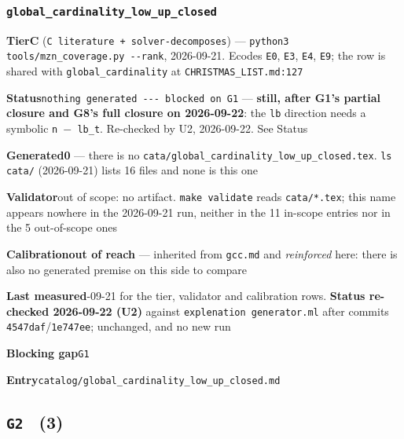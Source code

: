 \documentclass[10pt,a4paper]{article}
\newcommand{\entryfield}[2]{{\raggedright\textbf{#1}\quad #2\par}}
\begin{document}
\subsubsection*{\texttt{global\_\allowbreak{}cardinality\_\allowbreak{}low\_\allowbreak{}up\_\allowbreak{}closed}}
\label{entry:global-cardinality-low-up-closed}
\entryfield{Tier}{\textbf{C} (\texttt{C literature + solver-\allowbreak{}decomposes}) --- \texttt{python3 tools/\allowbreak{}mzn\_\allowbreak{}coverage.\allowbreak{}py -\allowbreak{}-\allowbreak{}rank}, 2026-09-21. Ecodes \texttt{E0}, \texttt{E3}, \texttt{E4}, \texttt{E9}; the row is shared with \texttt{global\_cardinality} at \texttt{CHRISTMAS\_LIST.md:127}}
\entryfield{Status}{\texttt{nothing generated -\allowbreak{}-\allowbreak{}-\allowbreak{} blocked on G1} --- \textbf{still, after G1's partial closure and G8's full closure on 2026-09-22}: the \texttt{lb} direction needs a symbolic \texttt{n $-$ lb\_t}. Re-checked by U2, 2026-09-22. See Status}
\entryfield{Generated}{\textbf{0} --- there is no \texttt{cata/\allowbreak{}global\_\allowbreak{}cardinality\_\allowbreak{}low\_\allowbreak{}up\_\allowbreak{}closed.\allowbreak{}tex}. \texttt{ls cata/} (2026-09-21) lists 16 files and none is this one}
\entryfield{Validator}{out of scope: no artifact. \texttt{make validate} reads \texttt{cata/*.tex}; this name appears nowhere in the 2026-09-21 run, neither in the 11 in-scope entries nor in the 5 out-of-scope ones}
\entryfield{Calibration}{\textbf{out of reach} --- inherited from \texttt{gcc.md} and \emph{reinforced} here: there is also no generated premise on this side to compare}
\entryfield{Last measured}{2026-09-21 for the tier, validator and calibration rows. \textbf{Status re-checked 2026-09-22 (U2)} against \texttt{explenation generator.ml} after commits \texttt{4547daf}/\texttt{1e747ee}; unchanged, and no new run}
\entryfield{Blocking gap}{\texttt{G1}}
\entryfield{Entry}{\texttt{catalog/global\_cardinality\_low\_up\_closed.md}}
\subsection*{\texttt{G2} \ \normalsize(3)}
\end{document}
